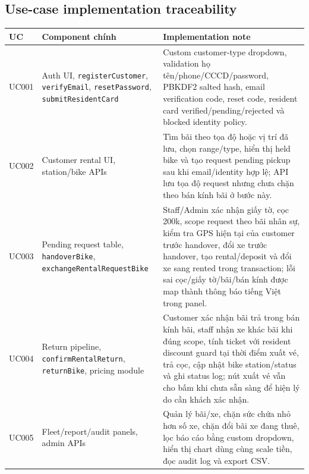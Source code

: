 \subsection{Use-case implementation traceability}
\begin{longtable}{P{0.14\textwidth}P{0.30\textwidth}P{0.46\textwidth}}
\toprule
\textbf{UC} & \textbf{Component chính} & \textbf{Implementation note} \\
\midrule
UC001 & Auth UI, \texttt{registerCustomer}, \texttt{verifyEmail}, \texttt{resetPassword}, \texttt{submitResidentCard} & Custom customer-type dropdown, validation họ tên/phone/CCCD/password, PBKDF2 salted hash, email verification code, reset code, resident card verified/pending/rejected và blocked identity policy. \\
UC002 & Customer rental UI, station/bike APIs & Tìm bãi theo tọa độ hoặc vị trí đã lưu, chọn range/type, hiển thị held bike và tạo request pending pickup sau khi email/identity hợp lệ; API lưu tọa độ request nhưng chưa chặn theo bán kính bãi ở bước này. \\
UC003 & Pending request table, \texttt{handoverBike}, \texttt{exchangeRentalRequestBike} & Staff/Admin xác nhận giấy tờ, cọc 200k, scope request theo bãi nhân sự, kiểm tra GPS hiện tại của customer trước handover, đổi xe trước handover, tạo rental/deposit và đổi xe sang rented trong transaction; lỗi sai cọc/giấy tờ/bãi/bán kính được map thành thông báo tiếng Việt trong panel. \\
UC004 & Return pipeline, \texttt{confirmRentalReturn}, \texttt{returnBike}, pricing module & Customer xác nhận bãi trả trong bán kính bãi, staff nhận xe khác bãi khi đúng scope, tính ticket với resident discount guard tại thời điểm xuất vé, trả cọc, cập nhật bike station/status và ghi status log; nút xuất vé vẫn cho bấm khi chưa sẵn sàng để hiện lý do cần khách xác nhận. \\
UC005 & Fleet/report/audit panels, admin APIs & Quản lý bãi/xe, chặn sức chứa nhỏ hơn số xe, chặn đổi bãi xe đang thuê, lọc báo cáo bằng custom dropdown, hiển thị chart dùng cùng scale tiền, đọc audit log và export CSV. \\
\bottomrule
\end{longtable}

